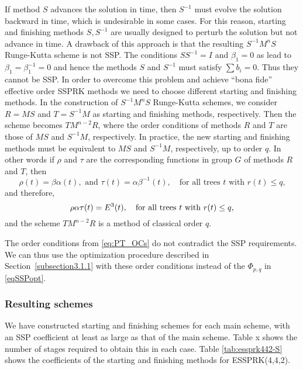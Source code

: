 If method $S$ advances the solution in time,
then $S^{-1}$ must evolve the solution backward in time, which is undesirable in
some cases.  For this reason,
starting and finishing methods $S,S^{-1}$ are usually designed to perturb
the solution but not advance in time.  
A drawback of this approach is that the resulting \(
S^{-1}M^{n}S \) Runge-Kutta scheme is not SSP. The conditions \( SS^{-1} = I \)
and \( \beta_{1} = 0 \) as lead to \( \beta_{1} = \beta^{-1}_{1} = 0 \) and
hence the methods \( S \) and \( S^{-1} \) must satisfy $\sum b_i = 0$.  Thus
they cannot be SSP.
In order to overcome this problem and achieve ``bona fide'' effective order SSPRK methods we need to choose different starting and finishing methods. In the construction of \( S^{-1}M^{n}S \) Runge-Kutta schemes, we consider \( R = MS \) and \( T = S^{-1}M \) as starting and finishing methods, respectively. Then the scheme becomes \( TM^{n-2}R \), where the order conditions of methods \( R \) and \( T \) are those of \( MS \) and \( S^{-1}M \), respectively.
In practice, the new starting and finishing methods must be equivalent to \( MS \) and \( S^{-1}M \), respectively, up to order $q$.
 In other words if \( \rho \) and \( \tau \) are the corresponding functions in group $G$ of methods \( R \) and \( T \), then
\begin{equation} \label{eq:PT_OCs}
    \rho(t) = \beta\alpha(t), \text{ and } \tau(t) = \alpha\beta^{-1}(t), \quad \text{for all trees $t$ with $r(t) \leq q$,}
\end{equation}
and therefore,
\begin{equation} \label{eq:TM^{n-2}R_OCs}
    \rho\alpha\tau(t) = E^3(t), \quad \text{for all trees $t$ with $r(t) \leq q$,}
\end{equation}
and the scheme \( TM^{n-2}R \) is a method of classical order \( q \).

The order conditions from \eqref{eq:PT_OCs} do not contradict the SSP
requirements.  We can thus use the optimization procedure described in
Section~\ref{subsection3.1.1} with these order conditions instead of
the $\Phi_{p,q}$ in \eqref{eqSSPopt}. 

\subsubsection{Resulting schemes}
We have constructed starting and finishing schemes for each main scheme,
with an SSP coefficient at least as large as that of the main scheme.
Table x shows the number of stages required to obtain this in each case.
Table \ref{tab:essprk442-S} shows the coefficients of the starting and finishing methods for 
ESSPRK(4,4,2).

